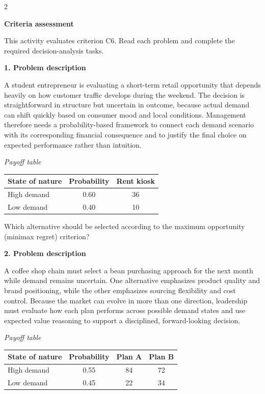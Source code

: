 \documentclass[12pt]{article}
\newcommand{\SubsectionBox}[1]{%
	\noindent\colorbox{gray!30}{%
		\parbox{\linewidth}{\textbf{#1}}%
	}\par\vspace{0.35cm}%
}
\begin{document}
	\begin{multicols}{2}
		\SubsectionBox{Criteria assessment}\vspace{-0.25cm}
		This activity evaluates criterion C6. Read each problem and complete the required decision-analysis tasks.

		\vspace{0.25cm}
		\SubsectionBox{1. Problem description}\vspace{-0.25cm}
		A student entrepreneur is evaluating a short-term retail opportunity that depends heavily on how customer traffic develops during the weekend. The decision is straightforward in structure but uncertain in outcome, because actual demand can shift quickly based on consumer mood and local conditions. Management therefore needs a probability-based framework to connect each demand scenario with its corresponding financial consequence and to justify the final choice on expected performance rather than intuition.
		
				\begin{center}
					\textit{Payoff table} \par
					\begin{tabular}{l c c}
						\toprule
						State of nature & Probability & Rent kiosk \\
						\midrule
						High demand & 0.60 & 36 \\
						Low demand & 0.40 & 10 \\
						\bottomrule
					\end{tabular}
				\end{center}
		
				Which alternative should be selected according to the maximum opportunity (minimax regret) criterion?

		\vspace{0.25cm}
		\SubsectionBox{2. Problem description}\vspace{-0.25cm}
		A coffee shop chain must select a bean purchasing approach for the next month while demand remains uncertain. One alternative emphasizes product quality and brand positioning, while the other emphasizes sourcing flexibility and cost control. Because the market can evolve in more than one direction, leadership must evaluate how each plan performs across possible demand states and use expected value reasoning to support a disciplined, forward-looking decision.
		
				\begin{center}
					\textit{Payoff table} \par
					\begin{tabular}{l c c c}
						\toprule
						State of nature & Probability & Plan A & Plan B \\
						\midrule
						High demand & 0.55 & 84 & 72 \\
						Low demand & 0.45 & 22 & 34 \\
						\bottomrule
					\end{tabular}
				\end{center}
		

\end{multicols}
\end{document}
